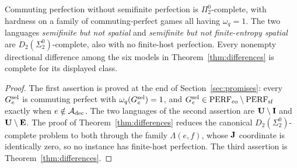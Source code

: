 \begin{theorem}\label{thm:Brefine}
Commuting perfection without semifinite perfection is $\Pi^0_2$-complete, with hardness on a family of commuting-perfect games all having $\omega_q=1$. The two languages \emph{semifinite but not spatial} and \emph{semifinite but not finite-entropy spatial} are $D_2(\Sigma^0_2)$-complete, also with no finite-host perfection. Every nonempty directional difference among the six models in Theorem~\ref{thm:differences} is complete for its displayed class.
\end{theorem}
\begin{proof}
The first assertion is proved at the end of Section~\ref{sec:promises}: every $G^{\rm sel}_e$ is commuting perfect with $\omega_q(G^{\rm sel}_e)=1$, and $G^{\rm sel}_e\in\mathrm{PERF}_{\mathrm{co}}\setminus\mathrm{PERF}_{\mathrm{sf}}$ exactly when $e\notin\mathcal A_{\rm dec}$. The two languages of the second assertion are $\mathbf U\setminus\mathbf I$ and $\mathbf U\setminus\mathbf E$. The proof of Theorem~\ref{thm:differences} reduces the canonical $D_2(\Sigma^0_2)$-complete problem to both through the family $\Lambda(e,f)$, whose $\mathbf J$ coordinate is identically zero, so no instance has finite-host perfection. The third assertion is Theorem~\ref{thm:differences}.
\end{proof}
